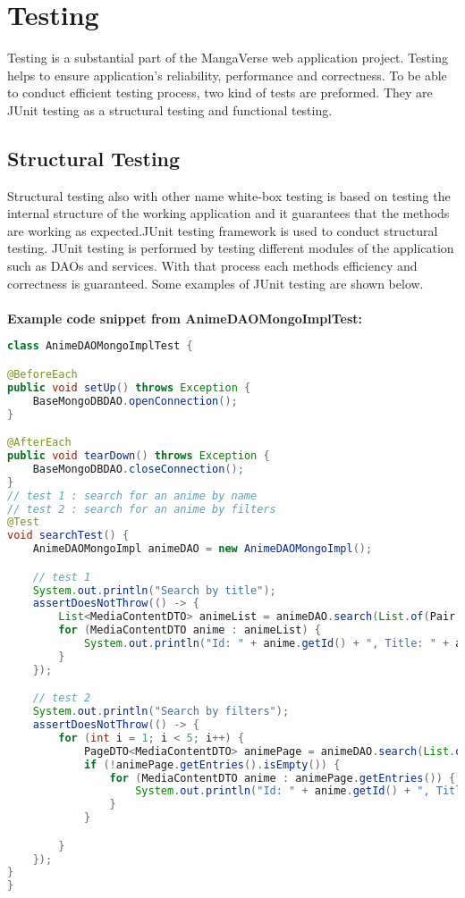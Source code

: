 \chapter{Testing}
Testing is a substantial part of the MangaVerse web application project. Testing helps to ensure application's 
reliability, performance and correctness. To be able to conduct efficient testing process, two kind of tests are preformed.
They are JUnit testing as a structural testing and functional testing.

\section{Structural Testing}
Structural testing also with other name white-box testing is based on testing the internal structure of the working application and it 
guarantees that the methods are working as expected.JUnit testing framework is used to conduct structural testing. JUnit testing is performed by testing 
different modules of the application such as DAOs and services. With that process each methods efficiency and correctness is guaranteed. 
Some examples of JUnit testing are shown below.\\ \\


\textbf{Example code snippet from AnimeDAOMongoImplTest:}
\begin{mdframed}[backgroundcolor=yellow!20, innerleftmargin=10pt, innerrightmargin=10pt]
    \begin{lstlisting}[language=java]
class AnimeDAOMongoImplTest {

@BeforeEach
public void setUp() throws Exception {
    BaseMongoDBDAO.openConnection();
}

@AfterEach
public void tearDown() throws Exception {
    BaseMongoDBDAO.closeConnection();
}
// test 1 : search for an anime by name
// test 2 : search for an anime by filters
@Test
void searchTest() {
    AnimeDAOMongoImpl animeDAO = new AnimeDAOMongoImpl();

    // test 1
    System.out.println("Search by title");
    assertDoesNotThrow(() -> {
        List<MediaContentDTO> animeList = animeDAO.search(List.of(Pair.of("title", "Attack on Titan")), Map.of("title", 1), 1, false).getEntries();
        for (MediaContentDTO anime : animeList) {
            System.out.println("Id: " + anime.getId() + ", Title: " + anime.getTitle());
        }
    });

    // test 2
    System.out.println("Search by filters");
    assertDoesNotThrow(() -> {
        for (int i = 1; i < 5; i++) {
            PageDTO<MediaContentDTO> animePage = animeDAO.search(List.of(Pair.of("$in",Map.of("tags", List.of("school clubs", "manwha")))), Map.of("title", 1), i, false);
            if (!animePage.getEntries().isEmpty()) {
                for (MediaContentDTO anime : animePage.getEntries()) {
                    System.out.println("Id: " + anime.getId() + ", Title: " + anime.getTitle());
                }
            }

        }
    });
}
}
    \end{lstlisting}
\end{mdframed}

